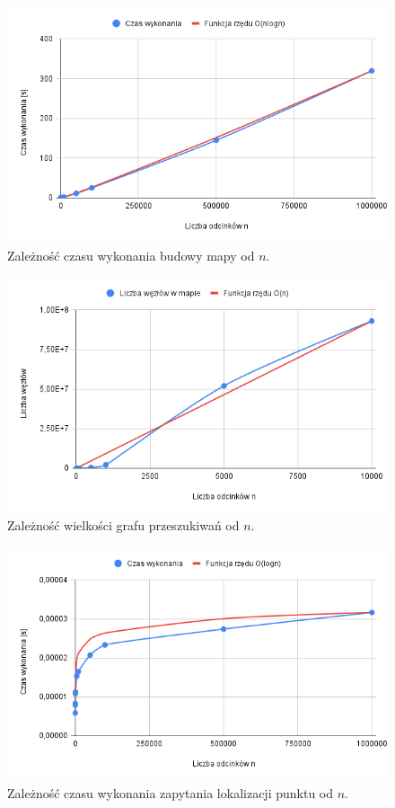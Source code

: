 \documentclass[11pt,a4paper]{article}
\begin{document}
\begin{figure}
    \centering
    \includegraphics[scale=0.5]{./res/figs/build_times_graph.png}
    \caption{Zależność czasu wykonania budowy mapy od $n$.}
\end{figure}

\begin{figure}
    \centering
    \includegraphics[scale=0.5]{./res/figs/build_sizes_graph.png}
    \caption{Zależność wielkości grafu przeszukiwań od $n$.}
\end{figure}

\begin{figure}
    \centering
    \includegraphics[scale=0.5]{./res/figs/query_times_graph.png}
    \caption{Zależność czasu wykonania zapytania lokalizacji punktu od $n$.}
\end{figure}
\end{document}
